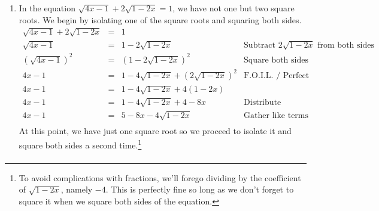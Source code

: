 \documentclass{ximera}
\begin{document}
\begin{example}
\begin{explanation}
\begin{enumerate}
\[\begin{array}{rclr}
(\sqrt[3]{2y+1})^3 & = & \left( \frac{\sqrt{2}}{3} \right)^{3} & \text{Cube both sides} \\ 

2y + 1 & = & \frac{(\sqrt{2})^3}{3^3} & \\ 

2y + 1 & = & \frac{2\sqrt{2}}{27} & \\  
2y  & = & \frac{2 \sqrt{2}}{27}  - 1 & \text{Subtract $1$} \\ 

2y  & = & \frac{2 \sqrt{2}}{27}  - \frac{27}{27} & \text{Common denominators} \\  

2y  & = & \frac{2 \sqrt{2} - 27}{27} & \text{Subtract fractions} \\ 

y  & = & \frac{2 \sqrt{2} - 27}{54} & \text{Divide by $2$ $\left(\text{multiply by $\frac{1}{2}$} \right)$} \\

\end{array}\] Since we raised both sides to an \textit{odd} power, we don't need to worry about extraneous solutions but we encourage the reader to check the solution just for the fun of it.

\item In the equation $\sqrt{4x-1}  + 2\sqrt{1 - 2x} = 1$, we have not one but two square roots.  We begin by isolating one of the square roots and squaring both sides.\[ \begin{array}{rclr}

\sqrt{4x-1}  + 2\sqrt{1 - 2x} & = & 1 & \\  

\sqrt{4x-1} & = & 1 - 2\sqrt{1-2x} & \text{Subtract $2\sqrt{1 - 2x}$ from both sides} \\ 

(\sqrt{4x-1})^2 & = & (1 - 2\sqrt{1-2x})^2 & \text{Square both sides} \\ 

4x - 1 & = & 1 - 4\sqrt{1-2x} + (2\sqrt{1-2x})^2 & \text{F.O.I.L. / Perfect Square Trinomial} \\ 

4x - 1 & = & 1 - 4\sqrt{1-2x} + 4(1-2x) & \\ 

4x - 1 & = & 1 - 4\sqrt{1-2x} + 4 - 8x & \text{Distribute} \\  

4x - 1 & = & 5 - 8x - 4\sqrt{1-2x} & \text{Gather like terms} \\ \end{array} \] At this point, we have just one square root so we proceed to isolate it and square both sides a second time.\footnote{To avoid complications with fractions, we'll forego dividing by the coefficient of $\sqrt{1-2x}$, namely $-4$. This is perfectly fine so long as we don't forget to square it when we square both sides of the equation.} \[ \begin{array}{rclr}


\end{array}\]
\end{enumerate}
\end{explanation}
\end{example}
\end{document}
